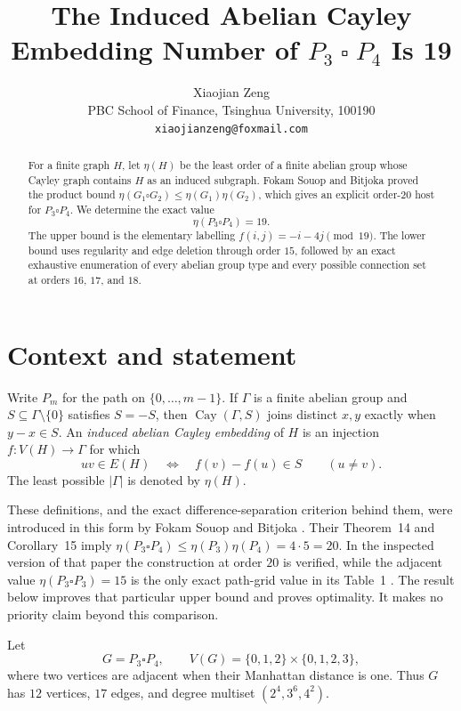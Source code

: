 \documentclass[11pt]{article}
\title{The Induced Abelian Cayley Embedding Number of
$P_3\mathbin{\square}P_4$ Is 19}
\author{Xiaojian Zeng\\
PBC School of Finance, Tsinghua University, 100190\\
\texttt{xiaojianzeng@foxmail.com}}
\date{}
\newcommand{\Cay}{\operatorname{Cay}}
\begin{document}
\maketitle

\begin{abstract}
For a finite graph $H$, let $\eta(H)$ be the least order of a finite
abelian group whose Cayley graph contains $H$ as an induced subgraph.
Fokam Souop and Bitjoka proved the product bound
$\eta(G_1\square G_2)\leq \eta(G_1)\eta(G_2)$, which gives an explicit
order-$20$ host for $P_3\square P_4$.  We determine the exact value
\[
  \eta(P_3\square P_4)=19.
\]
The upper bound is the elementary labelling
$f(i,j)=-i-4j\pmod {19}$.  The lower bound uses regularity and edge
deletion through order $15$, followed by an exact exhaustive enumeration
of every abelian group type and every possible connection set at orders
$16$, $17$, and $18$.
\end{abstract}

\section{Context and statement}

Write $P_m$ for the path on $\{0,\ldots,m-1\}$.  If $\Gamma$ is a
finite abelian group and $S\subseteq\Gamma\setminus\{0\}$ satisfies
$S=-S$, then $\Cay(\Gamma,S)$ joins distinct $x,y$ exactly when
$y-x\in S$.  An \emph{induced abelian Cayley embedding} of $H$ is an
injection $f:V(H)\to\Gamma$ for which
\[
 uv\in E(H) \quad\Longleftrightarrow\quad f(v)-f(u)\in S
 \qquad (u\ne v).
\]
The least possible $|\Gamma|$ is denoted by $\eta(H)$.

These definitions, and the exact difference-separation criterion behind
them, were introduced in this form by Fokam Souop and Bitjoka
\cite[Definition~1 and Proposition~3]{FokamSouopBitjoka2026}.  Their
Theorem~14 and Corollary~15 imply
$\eta(P_3\square P_4)\leq\eta(P_3)\eta(P_4)=4\cdot5=20$.
In the inspected version of that paper the construction at order $20$ is
verified, while the adjacent value $\eta(P_3\square P_3)=15$ is the only
exact path-grid value in its Table~1
\cite[Section~5.1 and Table~1]{FokamSouopBitjoka2026}.  The result below
improves that particular upper bound and proves optimality.  It makes no
priority claim beyond this comparison.

Let
\[
 G=P_3\square P_4,
 \qquad V(G)=\{0,1,2\}\times\{0,1,2,3\},
\]
where two vertices are adjacent when their Manhattan distance is one.
Thus $G$ has $12$ vertices, $17$ edges, and degree multiset
$(2^4,3^6,4^2)$.
\end{document}
